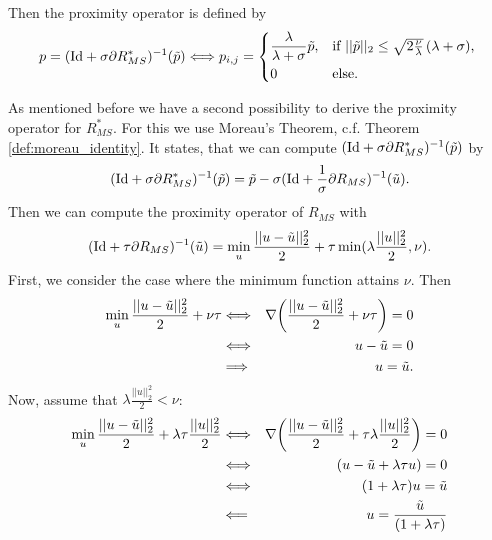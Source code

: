         Then the proximity operator is defined by
            \begin{equation}
                p = (\textnormal{Id} + \sigma \partial R_{MS}^{\ast})^{-1}(\tilde{p}) \Longleftrightarrow p_{i,j} =
                    \begin{dcases*}
                        \frac{\lambda}{\lambda + \sigma} \tilde{p}, & \textnormal{if $||\tilde{p}||_{2} \le \sqrt{2 \frac{\nu}{\lambda}} \, (\lambda + \sigma)$,} \\
                        0 & \textnormal{else.}
                    \end{dcases*}
                \label{eq:proximity_operator_f_star}
            \end{equation}

        As mentioned before we have a second possibility to derive the proximity operator for $R_{MS}^{\ast}$. For this we use Moreau's Theorem, c.f. Theorem \ref{def:moreau_identity}. It states, that we can compute $(\textnormal{Id} + \sigma \partial R_{MS}^{\ast})^{-1}(\tilde{p})$ by
            $$
                (\textnormal{Id} + \sigma \partial R_{MS}^{\ast})^{-1}(\tilde{p}) = \tilde{p} - \sigma (\textnormal{Id} + \frac{1}{\sigma} \partial R_{MS})^{-1}(\tilde{u}).
            $$
        Then we can compute the proximity operator of $R_{MS}$ with
            $$
                (\textnormal{Id} + \tau \partial R_{MS})^{-1}(\tilde{u}) = \min_{u} \frac{||u - \tilde{u}||_{2}^{2}}{2} + \tau \min(\lambda \frac{||u||_{2}^{2}}{2}, \nu).
            $$
        First, we consider the case where the minimum function attains $\nu$. Then
            \begin{eqnarray}
                \min_{u} \frac{||u - \tilde{u}||_{2}^{2}}{2} + \nu\tau &\Longleftrightarrow& \nabla \bigg( \frac{||u - \tilde{u}||_{2}^{2}}{2} + \nu\tau \bigg) = 0 \notag \\
                &\Longleftrightarrow& u - \tilde{u} = 0 \notag \\
                &\Longrightarrow& u = \tilde{u}. \notag
            \end{eqnarray}
        Now, assume that $\lambda \frac{||u||_{2}^{2}}{2} < \nu$:
            \begin{eqnarray}
                \min_{u} \frac{||u - \tilde{u}||_{2}^{2}}{2} + \lambda\tau \frac{||u||_{2}^{2}}{2} &\Longleftrightarrow& \nabla \bigg( \frac{||u - \tilde{u}||_{2}^{2}}{2} + \tau \lambda \frac{||u||_{2}^{2}}{2} \bigg) = 0 \notag \\
                &\Longleftrightarrow& (u - \tilde{u} + \lambda\tau u) = 0 \notag \\
                &\Longleftrightarrow& (1 + \lambda\tau) u = \tilde{u} \notag \\
                &\Longleftarrow& u = \frac{\tilde{u}}{(1 + \lambda\tau)} \notag
            \end{eqnarray}
